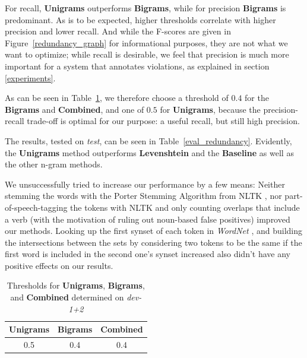 \documentclass[a4paper,10pt]{scrartcl}
\theoremstyle{style}
\begin{document}
For recall, \textbf{Unigrams} outperforms \textbf{Bigrams}, while for precision \textbf{Bigrams} is predominant.
As is to be expected, higher thresholds correlate with higher precision and lower recall. And while the F-scores are given in Figure~\ref{redundancy_graph} for informational purposes, they are not what we want to optimize; while recall is desirable, we feel that precision is much more important for a system that annotates violations, as explained in section \ref{experiments}.

As can be seen in Table~\ref{thresholds}, we therefore choose a threshold of $0.4$ for the \textbf{Bigrams} and \textbf{Combined}, and one of $0.5$ for \textbf{Unigrams}, because the precision-recall trade-off is optimal for our purpose: a useful recall, but still high precision.

The results, tested on \textit{test}, can be seen in Table~\ref{eval_redundancy}. Evidently, the \textbf{Unigrams} method outperforms \textbf{Levenshtein} and the \textbf{Baseline} as well as the other n-gram methods.

We unsuccessfully tried to increase our performance by a few means: Neither stemming the words with the Porter Stemming Algorithm \citep{porter1980algorithm} from NLTK \citep{bird2009natural}, nor part-of-speech-tagging the tokens with NLTK and only counting overlaps that include a verb (with the motivation of ruling out noun-based false positives) improved our methods. Looking up the first synset of each token in \textit{WordNet} \citep{fellbaum2005wordnet}, and building the intersections between the sets by considering two tokens to be the same if the first word is included in the second one's synset increased also didn't have any positive effects on our results.

\begin{table}
\begin{center}
\begin{tabular}{|c|c|c|}
\hline
\textbf{Unigrams} & \textbf{Bigrams} & \textbf{Combined} \\
\hline
0.5 & 0.4 & 0.4\\
\hline
\end{tabular}
\end{center}
\caption{Thresholds for \textbf{Unigrams}, \textbf{Bigrams}, and \textbf{Combined} determined on \textit{dev-1+2}}
\label{thresholds}
\end{table}
\end{document}
